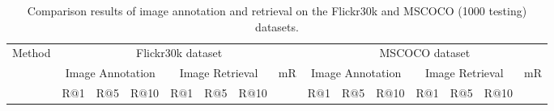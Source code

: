 \documentclass[10pt,twocolumn,letterpaper]{article}
\begin{document}
\begin{table*}[t] \small
\addtolength{\tabcolsep}{-1.5pt}
\centering
\caption{Comparison results of image annotation and retrieval on the Flickr30k and MSCOCO (1000 testing) datasets. }
\begin{tabular}{l|ccc|ccc|c|ccc|ccc|c}
\hline
\hline
\multirow{3}{0.7cm}{Method}  &  \multicolumn{7}{c|}{Flickr30k dataset} &  \multicolumn{7}{c}{MSCOCO dataset}\\
\cline{2-15}
        &  \multicolumn{3}{c|}{Image Annotation}  &  \multicolumn{3}{c|}{Image Retrieval} & \multirow{2}{0.5cm}{{mR}}
&  \multicolumn{3}{c|}{Image Annotation}  &  \multicolumn{3}{c|}{Image Retrieval} & \multirow{2}{0.5cm}{{mR}}  \\
\cline{2-7}
\cline{9-14}
     & R$@$1 & R$@$5  & R$@$10   & R$@$1 & R$@$5  & R$@$10  &
&R$@$1 & R$@$5  & R$@$10   & R$@$1 & R$@$5  & R$@$10  &    \\
\hline



\end{tabular}
\end{table*}
\end{document}
